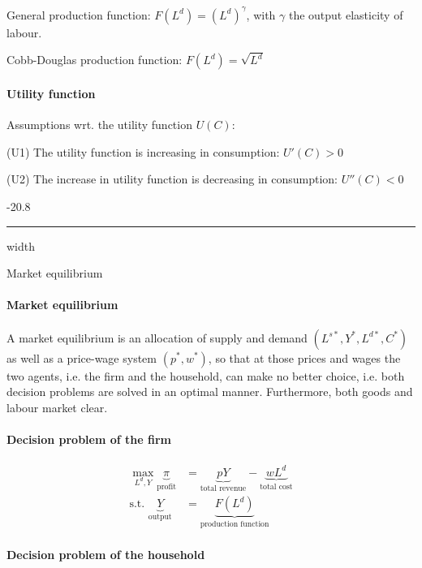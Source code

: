 \documentclass[a4paper,landscape,7pt,fleqn]{scrartcl}
\makeatletter
\renewcommand{\subsubsection}{\@startsection{subsubsection}{1}{0mm}%
{-2\baselineskip}{0.8\baselineskip}%
{\hrule depth 0.2pt width\columnwidth\vspace*{1.2em}\normalsize\bfseries}}
\makeatother
\begin{document}
\begin{multicols*}{3}
General production function: $F(L^d) = \left(L^d\right)^\gamma$, with $\gamma$ the output elasticity of labour.

Cobb-Douglas production function: $F(L^d) = \sqrt{L^d}$

\paragraph{Utility function}

Assumptions wrt. the utility function $U(C)$:
\begin{description}
\item{(U1)} The utility function is increasing in consumption: $U'(C) > 0$
\item{(U2)} The increase in utility function is decreasing in consumption: $U''(C) < 0$
\end{description}

\subsubsection{Market equilibrium}

\paragraph{Market equilibrium}

A market equilibrium is an allocation of supply and demand $(L^{s \ast}, Y^\ast, L^{d \ast}, C^\ast)$ as well as a price-wage system $(p^\ast, w^\ast)$, so that at those prices and wages the two agents, i.e. the firm and the household, can make no better choice, i.e. both decision problems are solved in an optimal manner. Furthermore, both goods and labour market clear.

\paragraph{Decision problem of the firm}

\begin{align*}
\max\limits_{L^d, Y} \underbrace{\pi}_\text{profit} &= \underbrace{p Y}_\text{total revenue} - \underbrace{w L^d}_\text{total cost} \\
\text{s.t. } \underbrace{Y}_\text{output} &= \underbrace{F(L^d)}_\text{production function}
\end{align*}

\paragraph{Decision problem of the household}


\end{multicols*}
\end{document}
